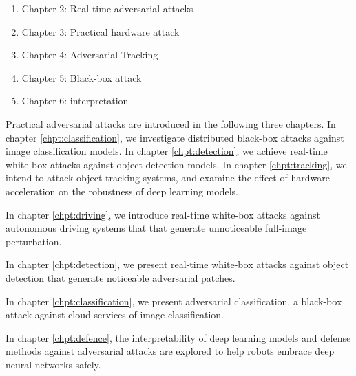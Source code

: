 
\begin{enumerate}
    \item Chapter 2: Real-time adversarial attacks
    \item Chapter 3: Practical hardware attack
    \item Chapter 4: Adversarial Tracking
    \item Chapter 5: Black-box attack
    \item Chapter 6: interpretation
\end{enumerate}

Practical adversarial attacks are introduced in the following three chapters. In chapter \ref{chpt:classification}, we investigate distributed black-box attacks against image classification models. In chapter \ref{chpt:detection}, we achieve real-time white-box attacks against object detection models. In chapter \ref{chpt:tracking}, we intend to attack object tracking systems, and examine the effect of hardware acceleration on the robustness of deep learning models. 


In chapter \ref{chpt:driving}, we introduce real-time white-box attacks against autonomous driving systems that that generate unnoticeable full-image perturbation.

In chapter \ref{chpt:detection}, we present real-time white-box attacks against object detection that generate noticeable adversarial patches.

In chapter \ref{chpt:classification}, we present adversarial classification, a black-box attack against cloud services of image classification.

In chapter \ref{chpt:defence}, the interpretability of deep learning models and defense methods against adversarial attacks are explored to help robots embrace deep neural networks safely.
